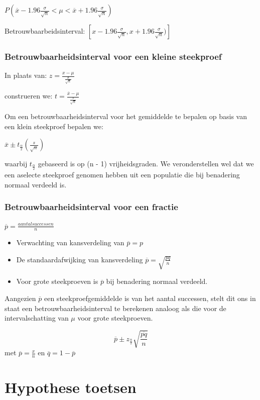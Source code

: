 \documentclass[a4paper,12pt]{article}
\begin{document}
$P(\overline{x} - 1.96\frac{\sigma}{\sqrt{n}} < \mu < \overline{x}+1.96\frac{\sigma}{\sqrt{n}})$

Betrouwbaarbeidsinterval: $[x - 1.96\frac{\sigma}{\sqrt{n}} , x+1.96\frac{\sigma}{\sqrt{n}})]$

\subsubsection{Betrouwbaarheidsinterval voor een kleine steekproef}
In plaats van:
$z = \frac{x - \mu}{\frac{\sigma}{\sqrt{n}}}$

construeren we:
$t=\frac{\overline{x}-\mu}{\frac{s}{\sqrt{n}}}$

Om een betrouwbaarheidsinterval voor het gemiddelde te bepalen
op basis van een klein steekproef bepalen we:

$\overline{x} \pm t_{\frac{\alpha}{2}}(\frac{s}{\sqrt{n}})$

waarbij $t_{\frac{\alpha}{2}}$ gebaseerd is op (n - 1) vrijheidsgraden.
We veronderstellen wel dat we een aselecte steekproef genomen hebben uit een populatie die bij benadering normaal verdeeld is.

\subsubsection{Betrouwbaarheidsinterval voor een fractie}
$\overline{p}=\frac{aantal successen}{n}$

\begin{itemize}
\item Verwachting van kansverdeling van $\overline{p} = p$
\item De standaardafwijking van kansverdeling $\overline{p} = \sqrt{\frac{pq}{n}}$
\item Voor grote steekproeven is $\overline{p}$ bij benadering normaal verdeeld.
\end{itemize}
Aangezien $\overline{p}$ een steekproefgemiddelde is van het aantal successen, stelt dit ons in staat een betrouwbaarheidsinterval te berekenen analoog als die voor de intervalschatting van $\mu$ voor grote steekproeven.

\begin{equation}
\overline{p} \pm z_{\frac{\alpha}{2}}\sqrt{\frac{\overline{pq}}{n}}
\end{equation}
met $\overline{p} = \frac{x}{n}$ en $\overline{q}= 1-\overline{p}$

\section{Hypothese toetsen}
\end{document}
